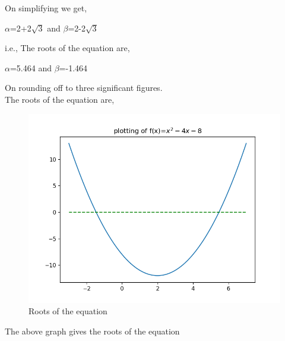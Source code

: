 \documentclass[journal,12pt,twocolumn]{IEEEtran}
\begin{document}
On simplifying we get,
\begin{center}
$\alpha$=2+2$\sqrt{3}$  and $\beta$=2-2$\sqrt{3}$ 
\end{center}
i.e., The roots of the equation are,
\begin{center}
$\alpha$=5.464 and $\beta$=-1.464
\end{center}
On rounding off to three significant figures.
\\The roots of the equation are,
\begin{center}
\end{center}
\begin{figure}[h] 
\includegraphics[scale=0.65]{Figure_0}\large
\caption{Roots of the equation}
\end{figure}

\noindent The above graph gives the roots of the equation
\end{document}
